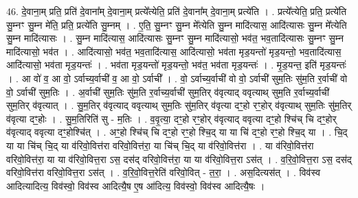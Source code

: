 \documentclass[17pt]{extarticle}
\begin{document}
46. दे॒वाना॒म् प्रति॒ प्रति॑ दे॒वाना᳚म् दे॒वाना॒म् प्रत्ये᳚त्येति॒ प्रति॑ दे॒वाना᳚म् दे॒वाना॒म् प्रत्ये॑ति । . प्रत्ये᳚त्येति॒ प्रति॒ प्रत्ये॑ति सु॒म्नꣳ सु॒म्न मे॑ति॒ प्रति॒ प्रत्ये॑ति सु॒म्नम् । . ए॒ति॒ सु॒म्नꣳ सु॒म्न मे᳚त्येति सु॒म्न मादि॑त्यास॒ आदि॑त्यासः सु॒म्न मे᳚त्येति सु॒म्न मादि॑त्यासः । . सु॒म्न मादि॑त्यास॒ आदि॑त्यासः सु॒म्नꣳ सु॒म्न मादि॑त्यासो॒ भव॑त॒ भव॒तादि॑त्यासः सु॒म्नꣳ सु॒म्न मादि॑त्यासो॒ भव॑त । . आदि॑त्यासो॒ भव॑त॒ भव॒तादि॑त्यास॒ आदि॑त्यासो॒ भव॑ता मृड॒यन्तो॑ मृड॒यन्तो॒ भव॒तादि॑त्यास॒ आदि॑त्यासो॒ भव॑ता मृड॒यन्तः॑ । . भव॑ता मृड॒यन्तो॑ मृड॒यन्तो॒ भव॑त॒ भव॑ता मृड॒यन्तः॑ । . मृ॒ड॒यन्त॒ इति॑ मृड॒यन्तः॑ । . आ वो॑ व॒ आ वो॒ ऽर्वाच्य॒र्वाची॑ व॒ आ वो॒ ऽर्वाची᳚ । . वो॒ ऽर्वाच्य॒र्वाची॑ वो वो॒ ऽर्वाची॑ सुम॒तिः सु॑म॒ति र॒र्वाची॑ वो वो॒ ऽर्वाची॑ सुम॒तिः । . अ॒र्वाची॑ सुम॒तिः सु॑म॒ति र॒र्वाच्य॒र्वाची॑ सुम॒तिर् व॑वृत्याद् ववृत्याथ् सुम॒ति र॒र्वाच्य॒र्वाची॑ सुम॒तिर् व॑वृत्यात् । . सु॒म॒तिर् व॑वृत्याद् ववृत्याथ् सुम॒तिः सु॑म॒तिर् व॑वृत्या दꣳ॒॒हो रꣳ॒॒होर् व॑वृत्याथ् सुम॒तिः सु॑म॒तिर् व॑वृत्या दꣳ॒॒होः । . सु॒म॒तिरिति॑ सु - म॒तिः । . व॒वृ॒त्या॒ दꣳ॒॒हो रꣳ॒॒होर् व॑वृत्याद् ववृत्या दꣳ॒॒हो श्चि॑च् चि दꣳ॒॒होर् व॑वृत्याद् ववृत्या दꣳ॒॒होश्चि॑त् । . अꣳ॒॒हो श्चि॑च् चि दꣳ॒॒हो रꣳ॒॒हो श्चि॒द् या या चि॑ दꣳ॒॒हो रꣳ॒॒हो श्चि॒द् या । . चि॒द् या या चि॑च् चि॒द् या व॑रिवो॒वित्त॑रा वरिवो॒वित्त॑रा॒ या चि॑च् चि॒द् या व॑रिवो॒वित्त॑रा । . या व॑रिवो॒वित्त॑रा वरिवो॒वित्त॑रा॒ या या व॑रिवो॒वित्त॒रा ऽस॒ दस॑द् वरिवो॒वित्त॑रा॒ या या व॑रिवो॒वित्त॒रा ऽस॑त् । . व॒रि॒वो॒वित्त॒रा ऽस॒ दस॑द् वरिवो॒वित्त॑रा वरिवो॒वित्त॒रा ऽस॑त् । . व॒रि॒वो॒वित्त॒रेति॑ वरिवो॒वित् - त॒रा॒ । . अस॒दित्यस॑त् । . विव॑स्व आदित्यादित्य॒ विव॑स्वो॒ विव॑स्व आदित्यै॒ष ए॒ष आ॑दित्य॒ विव॑स्वो॒ विव॑स्व आदित्यै॒षः । \newline
\end{document}
